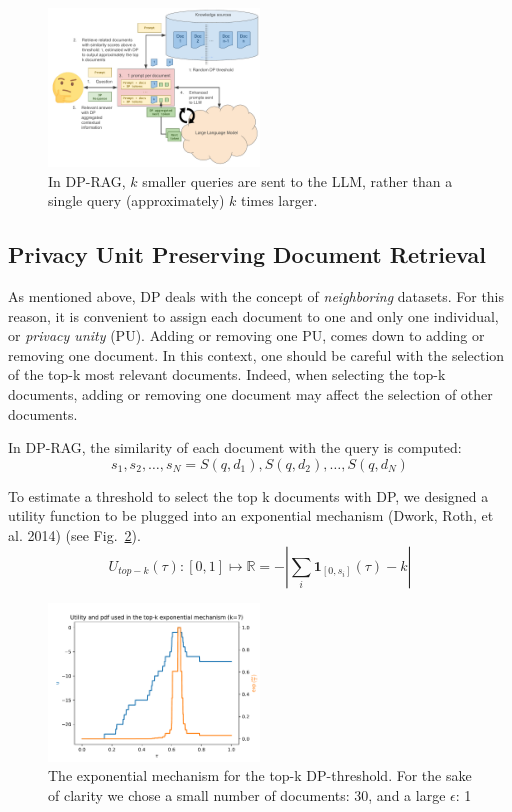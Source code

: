 \documentclass[conference]{IEEEtran}
\begin{document}
\begin{figure}
\centering
\includegraphics[width=0.5\textwidth]{figures/DP-RAG.pdf}
\caption{In DP-RAG, \(k\) smaller queries are sent to the LLM, rather than a single query (approximately) \(k\) times larger.}
\label{fig:dprag}
\end{figure}

\subsection{Privacy Unit Preserving Document
Retrieval}\label{privacy-unit-preserving-document-retrieval}

As mentioned above, DP deals with the concept of \emph{neighboring}
datasets. For this reason, it is convenient to assign each document to
one and only one individual, or \emph{privacy unity} (PU). Adding or
removing one PU, comes down to adding or removing one document. In this
context, one should be careful with the selection of the top-k most
relevant documents. Indeed, when selecting the top-k documents, adding
or removing one document may affect the selection of other documents.

In DP-RAG, the similarity of each document with the query is computed:
\[s_1, s_2,\ldots, s_N = S(q, d_1), S(q, d_2), \ldots, S(q, d_N)\]

To estimate a threshold to select the top k documents with DP, we
designed a utility function to be plugged into an exponential mechanism
(Dwork, Roth, et al. 2014) (see Fig.~\ref{fig:topkexp}).
\[U_{top-k}(\tau): [0, 1] \mapsto \mathbb{R} = -\left|\sum_i\mathbf{1}_{[0, s_i]}(\tau)-k\right|\]

\begin{figure}
\centering
\includegraphics[width=0.5\textwidth]{figures/top-k-exp.pdf}
\caption{The exponential mechanism for the top-k DP-threshold. For the
sake of clarity we chose a small number of documents: 30, and a large
\(\epsilon\): 1}\label{fig:topkexp}
\end{figure}
\end{document}
